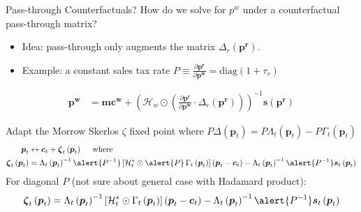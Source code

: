 \begin{frame}{Pass-through Counterfactuals?}
\footnotesize
How do we solve for $p^w$ under a counterfactual pass-through matrix?
\begin{itemize}
\item Idea: pass-through only augments the matrix $\Delta_r(\mathbf{p^r})$.
\item Example: a constant sales tax rate $P \equiv \frac{\partial \mathbf{p^r}}{\partial \mathbf{p^w}} = \text{diag}(1+\tau_r)$
\end{itemize}
\begin{align*}
\mathbf{p^w}  &= \mathbf{mc^w} + \left(\mathcal{H}_{w} \odot \left( \frac{\partial \mathbf{p^r}}{\partial \mathbf{p^w}} \cdot  \Delta_r(\mathbf{p^r} ) \right) \right)^{-1} \mathbf{s}(\mathbf{p^r})
\end{align*}

Adapt the Morrow Skerlos $\zeta$ fixed point where $P \Delta(\boldsymbol{p}_t) = P \Lambda_t\left(\boldsymbol{p}_t\right)- P \Gamma_t\left(\boldsymbol{p}_t\right)$
\begin{align*}
\boldsymbol{p}_t &\leftrightarrow \boldsymbol{c}_t+\boldsymbol{\zeta}_t\left(\boldsymbol{p}_t\right) \quad \text { where }\\
 \boldsymbol{\zeta}_t\left(\boldsymbol{p}_t\right)&=\Lambda_t\left(\boldsymbol{p}_t\right)^{-1} \alert{P^{-1}}\left[\mathcal{H}_t^* \odot \alert{P}\, \Gamma_t\left(\boldsymbol{p}_t\right)\right]\left(\boldsymbol{p}_t-\boldsymbol{c}_t\right)-\Lambda_t\left(\boldsymbol{p}_t\right)^{-1} \alert{P^{-1}} \boldsymbol{s}_t\left(\boldsymbol{p}_t\right)
\end{align*}
For diagonal $P$ (not sure about general case with Hadamard product):
\begin{align*}
 \boldsymbol{\zeta}_t\left(\boldsymbol{p}_t\right)=\Lambda_t\left(\boldsymbol{p}_t\right)^{-1}\left[\mathcal{H}_t^* \odot  \Gamma_t\left(\boldsymbol{p}_t\right)\right]\left(\boldsymbol{p}_t-\boldsymbol{c}_t\right)-\Lambda_t\left(\boldsymbol{p}_t\right)^{-1} \alert{P^{-1}} \boldsymbol{s}_t\left(\boldsymbol{p}_t\right)
\end{align*}
 
\end{frame}


